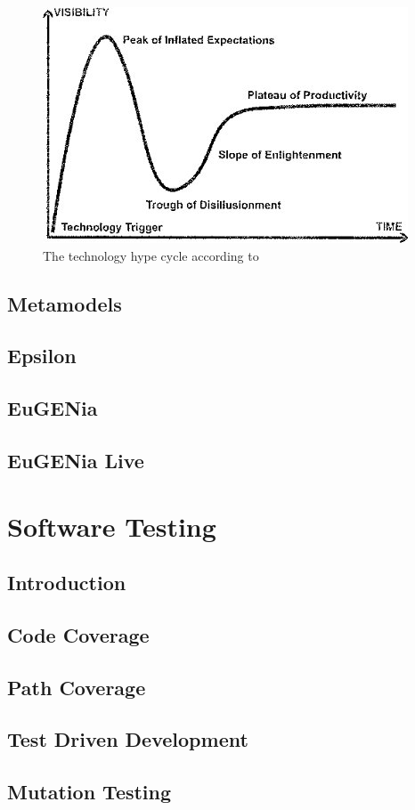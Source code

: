 \begin{figure}[p]
\includegraphics[scale=0.6]{figures/mde_pos.jpg}
\caption{The technology hype cycle according to \citet{brambillaBook}}
\label{mde_pos}
\end{figure}

\subsection{Metamodels}
\subsection{Epsilon}
\subsection{EuGENia}
\subsection{EuGENia Live}

\section{Software Testing}
\subsection{Introduction}
\subsection{Code Coverage}
\subsection{Path Coverage}
\subsection{Test Driven Development}
\subsection{Mutation Testing}

